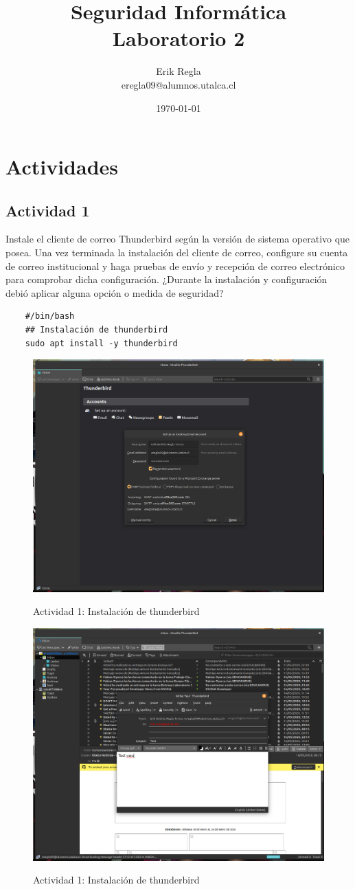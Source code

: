 \documentclass[11pt]{utalcaDoc}
\title{{\bf Seguridad Informática}\\ Laboratorio 2}
\author{Erik Regla\\ eregla09@alumnos.utalca.cl}
\date{\today}
\begin{document}
\maketitle
\newpage
\tableofcontents
\newpage

\section{Actividades}
\subsection{Actividad 1}{Instale el cliente de correo Thunderbird según la versión de sistema operativo que posea. Una vez terminada la instalación del cliente de correo, configure su cuenta de correo institucional y haga pruebas de envío y recepción de correo electrónico para comprobar dicha configuración. ¿Durante la instalación y configuración debió aplicar alguna opción o medida de seguridad?}

\begin{verbatim}
	#/bin/bash
	## Instalación de thunderbird
	sudo apt install -y thunderbird
\end{verbatim}

\begin{figure}[ht]
	\centering
	\includegraphics[width=.6\textwidth]{images/thunderbird2}\\
	\caption{Actividad 1: Instalación de thunderbird}
	\label{FIG:thunderbird1}
\end{figure}

\begin{figure}[ht]
	\centering
	\includegraphics[width=.6\textwidth]{images/thunderbird1}\\
	\caption{Actividad 1: Instalación de thunderbird}
	\label{FIG:thunderbird2}
\end{figure}
\end{document}
